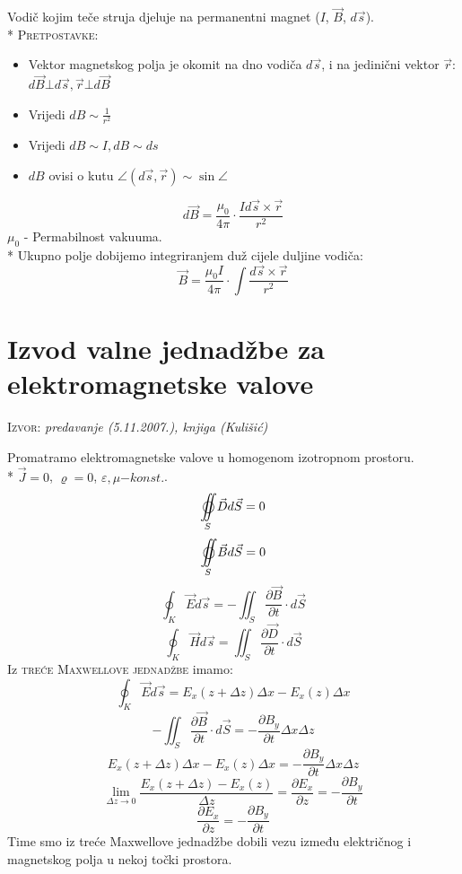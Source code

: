 \documentclass{report}
\begin{document}
Vodič kojim teče struja djeluje na permanentni magnet ($I$, $\vec B$, $d \vec s$).\\*
\textsc{Pretpostavke:}
{\begin{itemize}
	\item Vektor magnetskog polja je okomit na dno vodiča $d \vec s$, i na jedinični vektor $\vec r$:	$d\vec B \bot d \vec s,  \vec r \bot d \vec B$
	\item Vrijedi $dB \sim \frac{1}{r^2}$
	\item Vrijedi $dB \sim I, dB \sim ds$
	\item $dB$ ovisi o kutu $\angle \left ( d \vec s , \vec r \right ) \sim \sin \angle $
\end{itemize}
$$ d \vec B = \frac{\mu _0}{4 \pi} \cdot \frac{I d \vec s \times \vec r}{r^2}$$
$\mu _0$ - Permabilnost vakuuma.\\*
Ukupno polje dobijemo integriranjem duž cijele duljine vodiča:
$$ \vec B = \frac{\mu _0 I}{4 \pi} \cdot \int {\frac{d \vec s \times \vec r}{r^2}}$$

\section{Izvod valne jednadžbe za elektromagnetske valove}
\small \textsc{Izvor:} \textit{predavanje (5.11.2007.), knjiga (Kulišić)}

Promatramo elektromagnetske valove u homogenom izotropnom prostoru.\\*
$\vec{J} = 0$, $\varrho = 0$, $\varepsilon ,  \mu {- konst.}$.
\begin{equation}
	\mathop{{\int\!\!\!\!\!\int}\mkern-21mu \bigcirc}\limits_S {\vec Dd\vec S = 0}
	\label{valna-jed-1}
\end{equation}
\begin{equation}
	\mathop{{\int\!\!\!\!\!\int}\mkern-21mu \bigcirc}\limits_S {\vec Bd\vec S = 0}
	\label{valna-jed-2}
\end{equation}
\begin{equation}
	\oint_K {\vec Ed\vec s =  - \iint_S {\frac{{\partial \vec B}} {{\partial t}} \cdot d\vec S}}
	\label{valna-jed-3}
\end{equation}
\begin{equation}
	\oint_K {\vec Hd\vec s = \iint_S {\frac{{\partial \vec D}} {{\partial t}} \cdot d\vec S}}
	\label{valna-jed-4}
\end{equation}
Iz \textsc{treće Maxwellove jednadžbe} imamo:
$$\oint_K {\vec Ed\vec s} = E_x(z + \Delta z) \Delta x - E_x (z) \Delta x$$
$$- \iint_S {\frac{{\partial \vec B}} {{\partial t}} \cdot d\vec S} = - \frac{\partial B_y}{\partial t} \Delta x \Delta z$$
$$E_x(z + \Delta z) \Delta x - E_x (z) \Delta x = - \frac{\partial B_y}{\partial t} \Delta x \Delta z$$
$$\mathop {\lim }\limits_{\Delta z \to 0 } \frac{E_x(z + \Delta z) - E_x (z)}{\Delta z} = \frac{\partial E_x}{\partial z} = - \frac{\partial B_y}{\partial t}$$
$$\frac{\partial E_x}{\partial z} = - \frac{\partial B_y}{\partial t}$$
Time smo iz treće Maxwellove jednadžbe dobili vezu između električnog i magnetskog polja u nekoj točki prostora.

}
\end{document}

